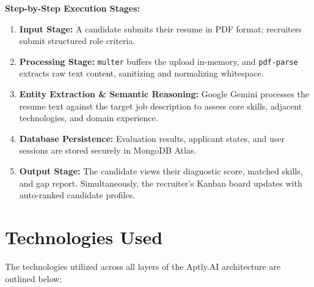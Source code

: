 \documentclass[12pt, a4paper]{article}
\begin{document}
\raggedright
\textbf{Step-by-Step Execution Stages:}
\begin{enumerate}[label=\textbf{Step \arabic*:}, leftmargin=1.8em, itemsep=2pt]
    \item \textbf{Input Stage:} A candidate submits their resume in PDF format; recruiters submit structured role criteria.
    \item \textbf{Processing Stage:} \texttt{multer} buffers the upload in-memory, and \texttt{pdf-parse} extracts raw text content, sanitizing and normalizing whitespace.
    \item \textbf{Entity Extraction \& Semantic Reasoning:} Google Gemini processes the resume text against the target job description to assess core skills, adjacent technologies, and domain experience.
    \item \textbf{Database Persistence:} Evaluation results, applicant states, and user sessions are stored securely in MongoDB Atlas.
    \item \textbf{Output Stage:} The candidate views their diagnostic score, matched skills, and gap report. Simultaneously, the recruiter's Kanban board updates with auto-ranked candidate profiles.
\end{enumerate}

\newpage

\section{Technologies Used}
The technologies utilized across all layers of the Aptly.AI architecture are outlined below:
\end{document}

